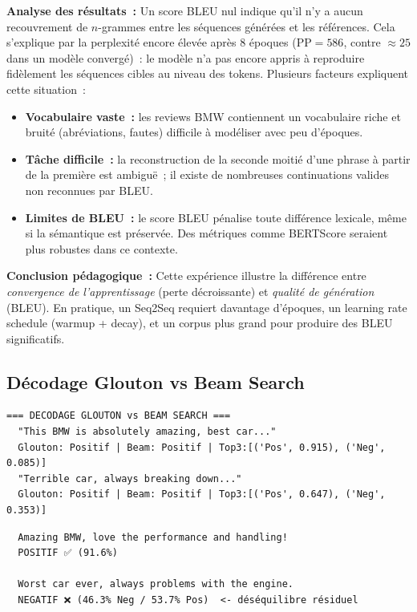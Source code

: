 \documentclass[12pt,a4paper]{report}
\begin{document}
\begin{newbox}
\textbf{Analyse des résultats~:} Un score BLEU nul indique qu'il n'y a aucun
recouvrement de $n$-grammes entre les séquences générées et les références.
Cela s'explique par la perplexité encore élevée après 8 époques
($\text{PP} = 586$, contre $\approx 25$ dans un modèle convergé)~:
le modèle n'a pas encore appris à reproduire fidèlement les séquences
cibles au niveau des tokens. Plusieurs facteurs expliquent cette situation~:

\begin{itemize}[leftmargin=*,nosep]
  \item \textbf{Vocabulaire vaste~:} les reviews BMW contiennent un vocabulaire
    riche et bruité (abréviations, fautes) difficile à modéliser avec peu d'époques.
  \item \textbf{Tâche difficile~:} la reconstruction de la seconde moitié d'une
    phrase à partir de la première est ambiguë~; il existe de nombreuses
    continuations valides non reconnues par BLEU.
  \item \textbf{Limites de BLEU~:} le score BLEU pénalise toute différence
    lexicale, même si la sémantique est préservée. Des métriques comme
    BERTScore seraient plus robustes dans ce contexte.
\end{itemize}

\textbf{Conclusion pédagogique~:} Cette expérience illustre la différence
entre \textit{convergence de l'apprentissage} (perte décroissante) et
\textit{qualité de génération} (BLEU). En pratique, un Seq2Seq requiert
davantage d'époques, un learning rate schedule (warmup + decay),
et un corpus plus grand pour produire des BLEU significatifs.
\end{newbox}

\subsection{Décodage Glouton vs Beam Search}
\begin{outputbox}
\begin{verbatim}
=== DECODAGE GLOUTON vs BEAM SEARCH ===
  "This BMW is absolutely amazing, best car..."
  Glouton: Positif | Beam: Positif | Top3:[('Pos', 0.915), ('Neg', 0.085)]
  "Terrible car, always breaking down..."
  Glouton: Positif | Beam: Positif | Top3:[('Pos', 0.647), ('Neg', 0.353)]
\end{verbatim}
\end{outputbox}

\begin{outputbox}
\begin{verbatim}
  Amazing BMW, love the performance and handling!
  POSITIF ✅ (91.6%)

  Worst car ever, always problems with the engine.
  NEGATIF ❌ (46.3% Neg / 53.7% Pos)  <- déséquilibre résiduel
\end{verbatim}
\end{outputbox}
\end{document}
